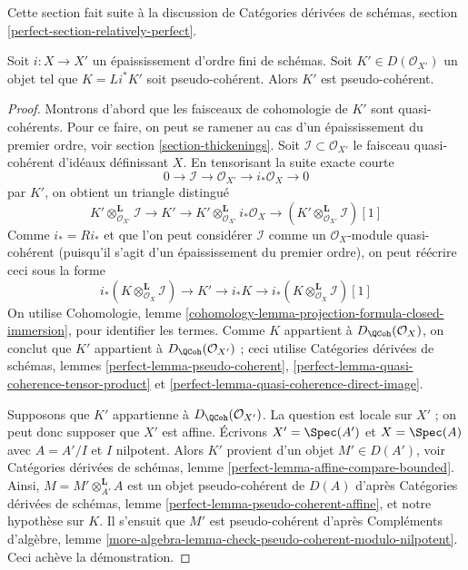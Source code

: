 \noindent
Cette section fait suite à la discussion de
Catégories dérivées de schémas, section
\ref{perfect-section-relatively-perfect}.

\begin{lemma}
\label{lemma-thickening-pseudo-coherent}
Soit $i : X \to X'$ un épaississement d'ordre fini de schémas. Soit
$K' \in D(\mathcal{O}_{X'})$ un objet tel que
$K = Li^*K'$ soit pseudo-cohérent. Alors $K'$ est pseudo-cohérent.
\end{lemma}

\begin{proof}
Montrons d'abord que les faisceaux de cohomologie de $K'$ sont quasi-cohérents.
Pour ce faire, on peut se ramener au cas d'un épaississement du premier ordre, voir
section \ref{section-thickenings}. Soit $\mathcal{I} \subset \mathcal{O}_{X'}$
le faisceau quasi-cohérent d'idéaux définissant $X$.
En tensorisant la suite exacte courte
$$
0 \to \mathcal{I} \to \mathcal{O}_{X'} \to i_*\mathcal{O}_X \to 0
$$
par $K'$, on obtient un triangle distingué
$$
K' \otimes_{\mathcal{O}_{X'}}^\mathbf{L} \mathcal{I}
\to K' \to
K' \otimes_{\mathcal{O}_{X'}}^\mathbf{L} i_*\mathcal{O}_X
\to
(K' \otimes_{\mathcal{O}_{X'}}^\mathbf{L} \mathcal{I})[1]
$$
Comme $i_* = Ri_*$ et que l'on peut considérer $\mathcal{I}$
comme un $\mathcal{O}_X$-module quasi-cohérent (puisqu'il s'agit d'un épaississement
du premier ordre), on peut réécrire ceci sous la forme
$$
i_*(K \otimes_{\mathcal{O}_X}^\mathbf{L} \mathcal{I})
\to K' \to
i_*K \to
i_*(K \otimes_{\mathcal{O}_X}^\mathbf{L} \mathcal{I})[1]
$$
On utilise Cohomologie, lemme
\ref{cohomology-lemma-projection-formula-closed-immersion},
pour identifier les termes. Comme $K$ appartient à
$D_\QCoh(\mathcal{O}_X)$, on conclut que
$K'$ appartient à $D_\QCoh(\mathcal{O}_{X'})$ ; ceci utilise
Catégories dérivées de schémas, lemmes
\ref{perfect-lemma-pseudo-coherent},
\ref{perfect-lemma-quasi-coherence-tensor-product} et
\ref{perfect-lemma-quasi-coherence-direct-image}.

\medskip\noindent
Supposons que $K'$ appartienne à $D_\QCoh(\mathcal{O}_{X'})$.
La question est locale sur $X'$ ; on peut donc supposer que $X'$ est affine.
Écrivons $X' = \Spec(A')$ et $X = \Spec(A)$ avec $A = A'/I$ et $I$ nilpotent.
Alors $K'$ provient d'un objet $M' \in D(A')$, voir
Catégories dérivées de schémas, lemme
\ref{perfect-lemma-affine-compare-bounded}.
Ainsi, $M = M' \otimes_{A'}^\mathbf{L} A$ est un objet pseudo-cohérent
de $D(A)$ d'après Catégories dérivées de schémas,
lemme \ref{perfect-lemma-pseudo-coherent-affine}, et notre hypothèse sur $K$.
Il s'ensuit que $M'$ est pseudo-cohérent d'après
Compléments d'algèbre, lemme
\ref{more-algebra-lemma-check-pseudo-coherent-modulo-nilpotent}.
Ceci achève la démonstration.
\end{proof}

